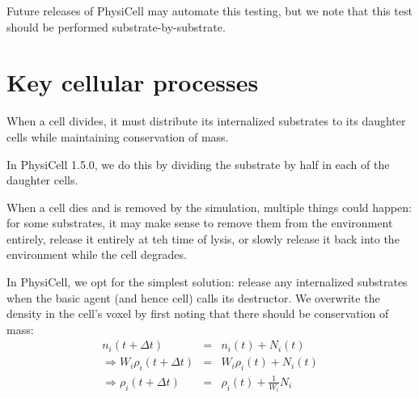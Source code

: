 \documentclass[11point]{article}
\newcommand{\beq}{\begin{eqnarray}}
\newcommand{\eeq}{\end{eqnarray}}
\begin{document}
Future releases of PhysiCell may automate this testing, but we note that this test should be performed 
substrate-by-substrate. 

\section{Key cellular processes}
When a cell divides, it must distribute its internalized substrates to its daughter cells while maintaining conservation of mass. 

In PhysiCell 1.5.0, we do this by dividing the substrate by half in each of the daughter cells. 

When a cell dies and is removed by the simulation, multiple things could happen: for some substrates, it may make sense to 
remove them from the environment entirely, release it entirely at teh time of lysis, or slowly release it back into the environment 
while the cell degrades. 

In PhysiCell, we opt for the simplest solution: release any internalized substrates when the basic agent (and hence cell) calls 
its destructor. We overwrite the density in the cell's voxel by first noting that there should be conservation of mass: 
\beq
n_i( t + \Delta t ) & = & 
n_i( t ) + N_i (t)  \\ 
\Longrightarrow 
W_i \rho_i(t + \Delta t) & = &
W_i \rho_i(t) + N_i(t) \\ 
\Longrightarrow 
\rho_i( t + \Delta t ) & = & 
\rho_i(t) + \frac{1}{W_i} N_i 
\eeq
\end{document}
